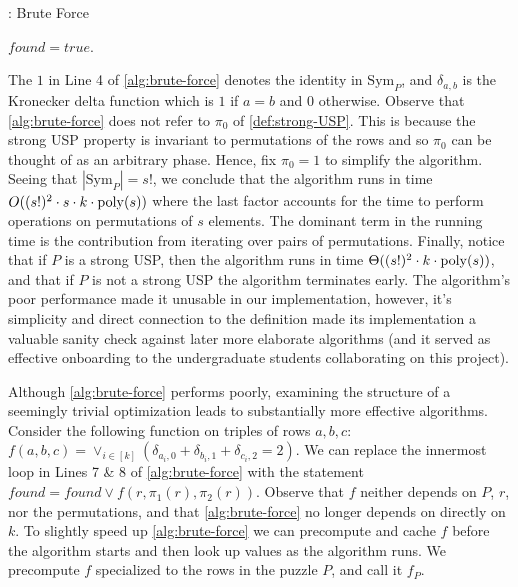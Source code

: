 \documentclass[11pt]{article}
\newcommand\Sym[1]{\ensuremath{\mathrm{Sym}_{#1}}}
\begin{document}
\begin{algorithm}[t]
  \caption{: Brute Force}
  \label{alg:brute-force}
\begin{algorithmic}[1]
  \For{$\pi_1 \in \Sym{P}$}
    \For{$\pi_2 \in \Sym{P}$}
             $found = true$. \EndIf
          \EndFor
        \EndFor
          \EndIf
      \EndIf
    \EndFor
  \EndFor
  \EndFunction
\end{algorithmic}
\end{algorithm}

The $1$ in Line 4 of \autoref{alg:brute-force} denotes the
identity in $\Sym{P}$, and $\delta_{a,b}$ is the Kronecker delta
function which is $1$ if $a = b$ and $0$ otherwise.  Observe that
\autoref{alg:brute-force} does not refer to $\pi_0$ of
\autoref{def:strong-USP}.  This is because the strong USP property is
invariant to permutations of the rows and so $\pi_0$ can be thought of
as an arbitrary phase.  Hence, fix $\pi_0 = 1$ to simplify the
algorithm.  Seeing that $|\Sym{P}| = s!$, we conclude that the algorithm
runs in time $O((s!)^2 \cdot s \cdot k \cdot \operatorname{poly}(s))$ where the last
factor accounts for the time to perform operations on permutations of
$s$ elements.  The dominant term in the running time is the
contribution from iterating over pairs of permutations.
Finally, notice that if $P$ is a strong USP, then the algorithm runs
in time $\Theta((s!)^2 \cdot k \cdot \operatorname{poly}(s))$, and that if $P$ is
not a strong USP the algorithm terminates early.  The algorithm's
poor performance made it unusable in our
implementation, however, it's simplicity and direct connection to the
definition made its implementation a valuable sanity check against
later more elaborate algorithms (and it served as effective onboarding to
the undergraduate students collaborating on this project).

Although \autoref{alg:brute-force} performs poorly, examining the
structure of a seemingly trivial optimization leads to substantially
more effective algorithms. Consider the following function on triples
of rows $a, b, c$: $f(a,b,c) = \vee_{i \in [k]} (\delta_{a_i,0} +
\delta_{b_i,1} + \delta_{c_i,2} = 2).$ We can replace the innermost
loop in Lines 7 \& 8 of \autoref{alg:brute-force} with the statement
$found = found \vee f(r, \pi_1(r), \pi_2(r))$.  Observe that $f$
neither depends on $P$, $r$, nor the permutations, and that
\autoref{alg:brute-force} no longer depends on directly on $k$.  To
slightly speed up \autoref{alg:brute-force} we can precompute and
cache $f$ before the algorithm starts and then look up values as the
algorithm runs.  We precompute $f$ specialized to the rows in the
puzzle $P$, and call it $f_P$.
\end{document}
